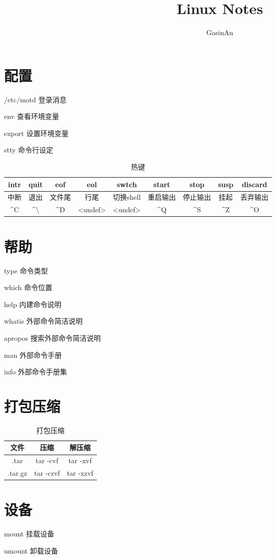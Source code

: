 \documentclass[12pt]{ctexart}
\title{Linux Notes}
\author{GasinAn}
\theoremstyle{definition}
\begin{document}
    \maketitle

    \tableofcontents

    \section{配置}

    /etc/motd 登录消息

    env 查看环境变量

    export 设置环境变量

    stty 命令行设定
    \begin{table}[htbp]
        \centering
        \begin{tabular}{|c|c|c|c|c|c|c|c|c|}
            \hline
            intr & quit & eof & eol & swtch & start & stop & susp & discard \\
            \hline
            中断 & 退出 & 文件尾 & 行尾 & 切换shell & 重启输出 & 停止输出 & 挂起 & 丢弃输出 \\
            \hline
            \^{}C & \^{}\textbackslash & \^{}D & <undef> & <undef> & \^{}Q & \^{}S & \^{}Z & \^{}O \\
            \hline
        \end{tabular}
        \caption{热键}
    \end{table}

    \section{帮助}

    type 命令类型

    which 命令位置

    help 内建命令说明

    whatis 外部命令简洁说明

    apropos 搜索外部命令简洁说明

    man 外部命令手册

    info 外部命令手册集

    \section{打包压缩}

    \begin{table}[htbp]
        \centering
        \begin{tabular}{|c|c|c}
            \hline
            文件 & 压缩 & 解压缩\\
            \hline
            .tar & tar -cvf & tar -xvf\\
            \hline
            .tar.gz & tar -czvf & tar -xzvf\\
            \hline
        \end{tabular}
        \caption{打包压缩}
    \end{table}

    \section{设备}

    mount 挂载设备

    umount 卸载设备
\end{document}

